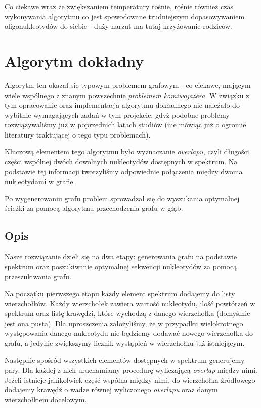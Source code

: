 \documentclass{article}
\begin{document}
Co ciekawe wraz ze zwiększaniem temperatury rośnie, rośnie również czas wykonywania algorytmu co jest spowodowane trudniejszym dopasowywaniem oligonukleotydów do siebie - duży narzut ma tutaj krzyżowanie rodziców.

\section{Algorytm dokładny}

Algorytm ten okazał się typowym problemem grafowym - co ciekawe, mającym wiele wspólnego z znanym powszechnie \textit{problemem komiwojażera}. W związku z tym opracowanie oraz implementacja algorytmu dokładnego nie należało do wybitnie wymagających zadań w tym projekcie, gdyż podobne problemy rozwiązywaliśmy już w poprzednich latach studiów (nie mówiąc już o ogromie literatury traktującej o tego typu problemach).

Kluczową elementem tego algorytmu było wyznaczanie \textit{overlapu}, czyli długości części wspólnej dwóch dowolnych nukleotydów dostępnych w spektrum. Na podstawie tej informacji tworzyliśmy odpowiednie połączenia między dwoma nukleotydami w grafie.

Po wygenerowaniu grafu problem sprowadzał się do wyszukania optymalnej ścieżki za pomocą algorytmu przechodzenia grafu w głąb.

\subsection{Opis}

Nasze rozwiązanie dzieli się na dwa etapy: generowania grafu na podstawie spektrum oraz poszukiwanie optymalnej sekwencji nukleotydów za pomocą przeszukiwania grafu.

Na początku pierwszego etapu każdy element spektrum dodajemy do listy wierzchołków. Każdy wierzchołek zawiera wartość nukleotydu, ilość powtórzeń w spektrum oraz listę krawędzi, które wychodzą z danego wierzchołka (domyślnie jest ona pusta). Dla uproszczenia założyliśmy, że w przypadku wielokrotnego występowania danego nukleotydu nie będziemy dodawać nowego wierzchołka do grafu, a jedynie zwiększymy licznik wystąpień w wierzchołku już istniejącym. 

Następnie spośród wszystkich elementów dostępnych w spektrum generujemy pary. Dla każdej z nich uruchamiamy procedurę wyliczającą \textit{overlap} między nimi. Jeżeli istnieje jakikolwiek część wspólna między nimi, do wierzchołka źródłowego dodajemy krawędź o wadze równej wyliczonego \textit{overlapu} oraz danym wierzchołkiem docelowym. 
\end{document}
